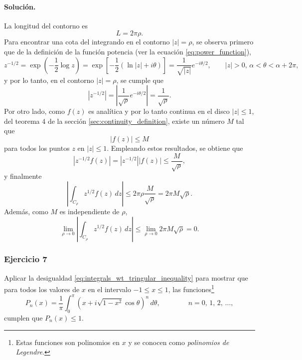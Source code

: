 \documentclass[a4paper]{report}
\begin{document}
\paragraph{Solución.} La longitud del contorno es
\[
 L=2\pi\rho.
\]
Para encontrar una cota del integrando en el contorno \(|z|=\rho\), se observa primero que de la definición de la función potencia (ver la ecuación \ref{eq:power_function}),
\[
 z^{-1/2}=\exp\left(-\frac{1}{2}\log z\right)=\exp\left[-\frac{1}{2}(\ln|z|+i\theta)\right]=\frac{1}{\sqrt{|z|}}e^{-i\theta/2},
 \qquad 
 |z|>0,\,\alpha<\theta<\alpha+2\pi,
\]
y por lo tanto, en el contorno \(|z|=\rho\), se cumple que 
\[
 |z^{-1/2}|=\left|\frac{1}{\sqrt{\rho}}e^{-i\theta/2}\right|=\frac{1}{\sqrt{\rho}}.
\]
Por otro lado, como \(f(z)\) es analítica y por lo tanto continua en el disco \(|z|\leq1\), del teorema 4 de la sección \ref{sec:continuity_definition}, existe un número \(M\) tal que 
\[
 |f(z)|\leq M 
\]
para todos los puntos \(z\) en \(|z|\leq1\). Empleando estos resultados, se obtiene que 
\[
 |z^{-1/2}f(z)|=|z^{-1/2}||f(z)|\leq\frac{M}{\sqrt{\rho}},
\]
y finalmente
\[
 \left|\int_{C_\rho}z^{1/2}f(z)\,dz\right|\leq2\pi\rho\frac{M}{\sqrt{\rho}}=2\pi M\sqrt{\rho}.
\]
Además, como \(M\) es independiente de \(\rho\),
\[
 \lim_{\rho\to0}\left|\int_{C_\rho}z^{1/2}f(z)\,dz\right|\leq\lim_{\rho\to0}2\pi M\sqrt{\rho}=0.
\]

\subsubsection{Ejercicio 7}

Aplicar la desigualdad \ref{eq:integrals_wt_tringular_inequality} para mostrar que para todos los valores de \(x\) en el intervalo \(-1\leq x\leq1\), las funciones\footnote{Estas funciones son polinomios en \(x\) y se conocen como \emph{polinomios de Legendre}.}
\[
 P_n(x)=\frac{1}{\pi}\int_0^\pi(x+i\sqrt{1-x^2}\cos\theta)^n\,d\theta,
 \qquad\qquad 
 n=0,\,1,\,2,\,\dots,
\]
cumplen que \(P_n(x)\leq1\).
\end{document}
